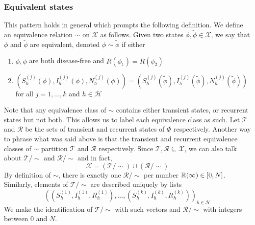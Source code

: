 \documentclass[a4paper]{article}
\begin{document}
	\subsubsection{Equivalent states}
	This pattern holds in general which prompts the following definition. We define an equivalence relation $\sim$ on $\mathcal{X}$ as follows. Given two states $\phi, \tilde{\phi} \in \mathcal{X}$, we say that $\phi$ and $\tilde{\phi}$ are equivalent, denoted $\phi \sim \tilde{\phi}$ if either  
	\begin{enumerate}
		\item $\phi, \tilde{\phi}$ are both disease-free and $R(\phi_{1}) = R(\phi_{2})$
		\item $(S^{(j)}_{h}(\phi), I^{(j)}_{h}(\phi), N^{(j)}_{h}(\phi)) = (S^{(j)}_{h}(\tilde{\phi}), I^{(j)}_{h}(\tilde{\phi}), N^{(j)}_{h}(\tilde{\phi}))$
		for all $j = 1, \dots, k$ and $h \in \mathcal{H}$
	\end{enumerate}
	Note that any equivalence class of $\sim$ contains either transient states, or recurrent states but not both. This allows us to label each equivalence class as such. Let $\mathcal{T}$ and $\mathcal{R}$ be the sets of transient and recurrent states of $\Phi$ respectively. Another way to phrase what was said above is that the transient and recurrent equivalence classes of $\sim$ partition $\mathcal{T}$ and $\mathcal{R}$ respectively. Since $\mathcal{T}, \mathcal{R} \subseteq \mathcal{X}$, we can also talk about $\mathcal{T}/\sim$ and $\mathcal{R}/\sim$ and in fact,
	$$\mathcal{X} = (\mathcal{T}/\sim) \cup (\mathcal{R}/\sim)$$
	By definition  of $\sim$, there is exactly one $\mathcal{R}/\sim$ per number $\mathbb{R}(\infty) \in [0, N]$. Similarly, elements of $\mathcal{T}/\sim$ are described uniquely by lists $$((S^{(1)}_{h}, I^{(1)}_{h}, R^{(1)}_{h}), \dots, (S^{(k)}_{h}, I^{(k)}_{h}, R^{(k)}_{h}))_{h \in \mathcal{H}}$$
	We make the identification of $\mathcal{T}/\sim$ with such vectors and $\mathcal{R}/\sim$ with integers between $0$ and $N$. 
\end{document}
